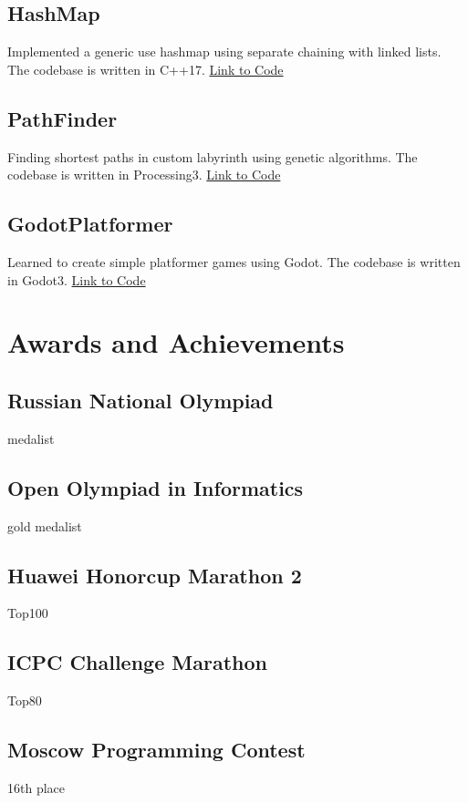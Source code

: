 \documentclass[12pt]{article}
\begin{document}
\subsection{HashMap} Implemented a generic use hashmap using separate chaining with linked lists. The codebase is written in C++17. \textcolor{blue}{\href{https://github.com/okwedook/HashMap}{Link to Code}}
\subsection{PathFinder} Finding shortest paths in custom labyrinth using genetic algorithms. The codebase is written in Processing3. \textcolor{blue}{\href{https://github.com/okwedook/PathFinder}{Link to Code}}
\subsection{GodotPlatformer} Learned to create simple platformer games using Godot. The codebase is written in Godot3. \textcolor{blue}{\href{https://github.com/okwedook/GodotPlatformerTutorial}{Link to Code}}

\section{Awards and Achievements}

\subsection{Russian National Olympiad} medalist

\subsection{Open Olympiad in Informatics} gold medalist

\subsection{Huawei Honorcup Marathon 2} Top100

\subsection{ICPC Challenge Marathon} Top80

\subsection{Moscow Programming Contest} 16th place
\end{document}
